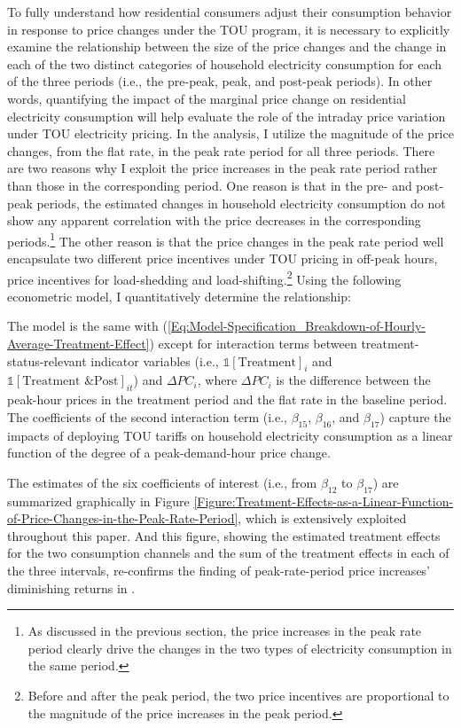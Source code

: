 To fully understand how residential consumers adjust their consumption behavior in response to price changes under the TOU program, it is necessary to explicitly examine the relationship between the size of the price changes and the change in each of the two distinct categories of household electricity consumption for each of the three periods (i.e., the pre-peak, peak, and post-peak periods). In other words, quantifying the impact of the marginal price change on residential electricity consumption will help evaluate the role of the intraday price variation under TOU electricity pricing. In the analysis, I utilize the magnitude of the price changes, from the flat rate, in the peak rate period for all three periods. There are two reasons why I exploit the price increases in the peak rate period rather than those in the corresponding period. One reason is that in the pre- and post-peak periods, the estimated changes in household electricity consumption do not show any apparent correlation with the price decreases in the corresponding periods.\footnote{As discussed in the previous section, the price increases in the peak rate period clearly drive the changes in the two types of electricity consumption in the same period.} The other reason is that the price changes in the peak rate period well encapsulate two different price incentives under TOU pricing in off-peak hours, price incentives for load-shedding and load-shifting.\footnote{Before and after the peak period, the two price incentives are proportional to the magnitude of the price increases in the peak period.} Using the following econometric model, I quantitatively determine the relationship:

The model is the same with (\ref{Eq:Model-Specification_Breakdown-of-Hourly-Average-Treatment-Effect}) except for interaction terms between treatment-status-relevant indicator variables (i.e., $\mathds{1}[\text{Treatment}]_{i}$ and $\mathds{1}[\text{Treatment \& Post}]_{it}$) and $\Delta PC_{i}$, where $\Delta PC_{i}$ is the difference between the peak-hour prices in the treatment period and the flat rate in the baseline period. The coefficients of the second interaction term (i.e., $\beta_{15}$, $\beta_{16}$, and $\beta_{17}$) capture the impacts of deploying TOU tariffs on household electricity consumption as a linear function of the degree of a peak-demand-hour price change. 


The estimates of the six coefficients of interest (i.e., from $\beta_{12}$ to $\beta_{17}$) are summarized graphically in Figure \ref{Figure:Treatment-Effects-as-a-Linear-Function-of-Price-Changes-in-the-Peak-Rate-Period}, which is extensively exploited throughout this paper. And this figure, showing the estimated treatment effects for the two consumption channels and the sum of the treatment effects in each of the three intervals, re-confirms the finding of peak-rate-period price increases' diminishing returns in \cite{Peaking-Interest:How-Awareness-Drives-the-Effectiveness-of-Time-of-Use-Electricity-Pricing_Prest_2020}. 

